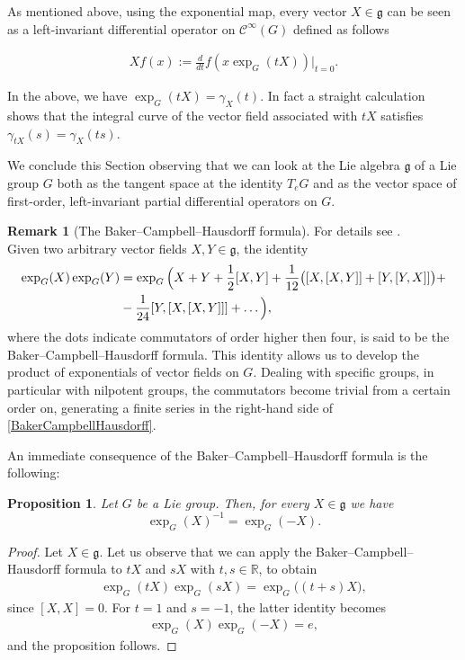\documentclass[12pt,oneside,a4paper]{book}
\numberwithin{equation}{section}     %
\theoremstyle{plain}
\newtheorem{proposition}[theorem]{Proposition}
\theoremstyle{definition}
\newtheorem{remark}[theorem]{Remark}
\newcommand{\R}{{\mathbb R}}
\begin{document}
As mentioned above, using the exponential map, every vector $X\in\mathfrak{g}$ can be seen as a left-invariant differential operator on $\mathcal{C}^\infty(G)$ defined as follows

\begin{align}\label{vectorfield}
Xf(x):=\frac{d}{dt}f(x\exp_G(tX))\Bigr|_{t=0}.
\end{align}

In the above, we have $\exp_G(tX)=\gamma_X(t)$. In fact a straight calculation shows that the integral curve of the vector field associated with $tX$ satisfies $\gamma_{tX}(s)=\gamma_X(ts)$.

We conclude this Section observing that we can look at the Lie algebra $\mathfrak{g}$ of a Lie group $G$ both as the tangent space at the identity $T_e G$ and as the vector space of first-order, left-invariant partial differential operators on $G$.

\begin{remark}[The Baker--Campbell--Hausdorff formula]
	For details see \cite{CG90,H2003,R2014}. \\
	Given two arbitrary vector fields $X, Y\in\mathfrak{g}$, the identity 
	\begin{align}\notag
	\exp_{G}(X)\exp_{G}(Y)&=\exp_{G}\Big(X+Y+\frac{1}{2}[X,Y]+\frac{1}{12}\big([X,[X,Y]]+[Y,[Y,X]]\big)+\\
	&-\frac{1}{24}[Y,[X,[X,Y]]]+\dots\Big),\label{BakerCampbellHausdorff}
	\end{align}
	where the dots indicate commutators of order higher then four, is said to be the Baker--Campbell--Hausdorff formula. This identity allows us to develop the product of exponentials of vector fields on $G$.
	Dealing with specific groups, in particular with nilpotent groups, the commutators become trivial from a certain order on, generating a finite series in the right-hand side of \eqref{BakerCampbellHausdorff}.
	
\end{remark}
An immediate consequence of the Baker--Campbell--Hausdorff formula is the following:
\begin{proposition}\label{inverseexponential}
	Let $G$ be a Lie group. Then, for every $X\in\mathfrak{g}$ we have
	\[
	\exp_G(X)^{-1}=\exp_{G}(-X).
	\]
\end{proposition}
\begin{proof}
	Let $X\in\mathfrak{g}$. Let us observe that we can apply the Baker--Campbell--Hausdorff formula to $tX$ and $sX$ with $t,s\in \R$, to obtain 
	\begin{align*}
	\exp_{G}(tX)\exp_{G}(sX)=\exp_{G}\big((t+s)X\big),
	\end{align*}
	since $[X,X]=0$.
	For $t=1$ and $s=-1$, the latter identity becomes
	\begin{align*}
	\exp_{G}(X)\exp_{G}(-X)=e,
	\end{align*}
	and the proposition follows.
\end{proof}
\end{document}

